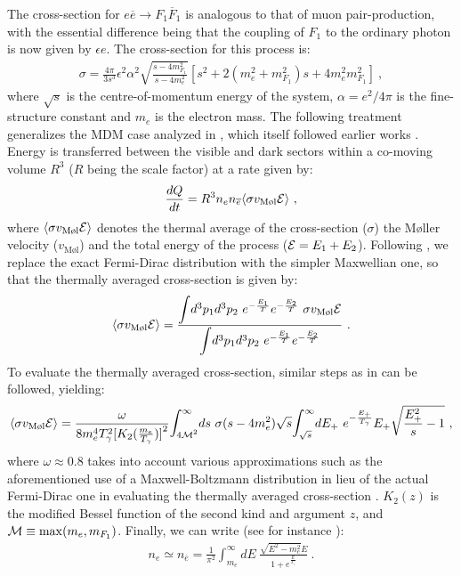 \documentclass[12pt]{article}
\begin{document}
The cross-section for $e \overline{e} \rightarrow F_1 \overline{F}_1$ is
analogous to that of muon pair-production, with the essential difference
being that the coupling of $F_1$ to the ordinary photon is now given by
$\epsilon e$. The cross-section for this process is:
%
\begin{eqnarray}
\sigma = \frac{4\pi}{3s^3} \epsilon ^2 \alpha ^2 \sqrt{\frac{s - 4 m
_{F_1} ^2}{s - 4 m _{e} ^2}} \left[ 
s^2 + 2 \left (m _{e} ^2 + m _{F_1} ^2 \right )s + 4m _{e} ^2 m _{F_1}
^2 \right] \ ,
\end{eqnarray}
%
where $\sqrt{s}$ is the centre-of-momentum energy of the system, $\alpha
= e^2/4\pi$ is the fine-structure constant and $m _{e}$ is the electron
mass. The following treatment generalizes the MDM case analyzed in
\cite{predictions}, which itself followed earlier works
\cite{updated,carlson,ciarcellutiliege}. Energy is transferred between
the visible and dark sectors within a co-moving volume $R^3$ ($R$ being
the scale factor) at a rate given by:
%
\begin{eqnarray}
\frac{dQ}{dt} = R^3 n _{e} n _{\overline{e}} \langle \sigma v_{\text{M\o
l}} {\cal E} \rangle \ ,
\label{dqdt}
\end{eqnarray}
%
where $\langle \sigma v_{\text{M\o  l}} {\cal E}\rangle$ denotes the thermal
average of the cross-section ($\sigma$) the M\o ller velocity
($v_{\text{M\o l}}$) and the total energy of the process (${\cal E} = E_1 + E_2$).
Following \cite{ciarcellutiliege,gondologelmini}, we replace the exact
Fermi-Dirac distribution 
with the simpler Maxwellian one, so that the thermally averaged
cross-section is given by:
%
\begin{eqnarray}
\langle \sigma v_{\text{M\o l}} {\cal E} \rangle = \frac{\mathlarger
\int d^3p_1 d^3p_2 \ e^{-\frac{E_1}{T}} e^{-\frac{E_2}{T}} \ \sigma
v_{\text{M\o l}}{\cal E}}{\mathlarger \int d^3p_1 d^3p_2 \
e^{-\frac{E_1}{T}}e^{-\frac{E_2}{T}}} \ .
\end{eqnarray}
%
To evaluate the thermally averaged cross-section, similar steps as in
\cite{ciarcellutiliege,gondologelmini} can be followed, yielding:
%
\begin{eqnarray}
\langle \sigma v_{\text{M\o l}}{\cal E} \rangle = 
\frac{\omega}{8m_e^4 T_{\gamma}^2 {[K_2(\frac{m_e}{T_{\gamma}})]}^2}
\mathlarger \int _{4{\cal M}^2}^{\infty} ds \ \sigma (s - 4m_e^2)
\sqrt{s} \mathlarger \int _{\sqrt{s}}^{\infty} dE_+ \ e^{-\frac{E_+}{T
_{\gamma}}} E_+ \sqrt{\frac{E _+ ^2}{s} - 1} \ ,
\label{sig}
\end{eqnarray}
%
where $\omega \approx 0.8$ takes into account various approximations
such as the aforementioned use of a Maxwell-Boltzmann distribution in
lieu of the actual Fermi-Dirac one in evaluating the thermally averaged
cross-section \cite{ciarcellutiliege}. $K_2(z)$ is the modified Bessel
function of the second kind and argument $z$, and ${\cal M} \equiv
\max(m _e, m _{F_1})$. Finally, we can write (see for instance
\cite{earlyuniverse}):
%
\begin{eqnarray}
n _{e} \simeq n _{\overline{e}} = \frac{1}{\pi ^2} \int _{m_e} ^{\infty}
dE \ \frac{\sqrt{E^2 - m _e ^2}E}{1 + e^{\frac{E}{T _{\gamma}}}} \ .
\end{eqnarray}
%
\end{document}
